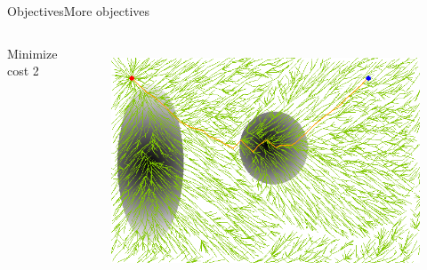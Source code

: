 \begin{frame}{Objectives}{More objectives}
\begin{columns}
	{ Minimize cost 2}
	\begin{figure}
		\centering
		\includegraphics[width=\linewidth]{figure/sim7-3obj/MORRTstar02-2.png}
		\label{fig:sim:03:prob3}
	\end{figure}
\end{columns}
\end{frame}

